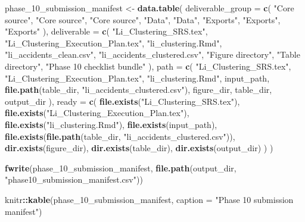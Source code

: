 \documentclass[
]{article}
\newenvironment{Shaded}{\begin{snugshade}}{\end{snugshade}}
\newcommand{\AttributeTok}[1]{\textcolor[rgb]{0.13,0.29,0.53}{#1}}
\newcommand{\FunctionTok}[1]{\textcolor[rgb]{0.13,0.29,0.53}{\textbf{#1}}}
\newcommand{\NormalTok}[1]{#1}
\newcommand{\OtherTok}[1]{\textcolor[rgb]{0.56,0.35,0.01}{#1}}
\newcommand{\SpecialCharTok}[1]{\textcolor[rgb]{0.81,0.36,0.00}{\textbf{#1}}}
\newcommand{\StringTok}[1]{\textcolor[rgb]{0.31,0.60,0.02}{#1}}
\begin{document}
\begin{Shaded}
\begin{Highlighting}[]
\NormalTok{phase\_10\_submission\_manifest }\OtherTok{\textless{}{-}} \FunctionTok{data.table}\NormalTok{(}
  \AttributeTok{deliverable\_group =} \FunctionTok{c}\NormalTok{(}
    \StringTok{"Core source"}\NormalTok{,}
    \StringTok{"Core source"}\NormalTok{,}
    \StringTok{"Core source"}\NormalTok{,}
    \StringTok{"Data"}\NormalTok{,}
    \StringTok{"Data"}\NormalTok{,}
    \StringTok{"Exports"}\NormalTok{,}
    \StringTok{"Exports"}\NormalTok{,}
    \StringTok{"Exports"}
\NormalTok{  ),}
  \AttributeTok{deliverable =} \FunctionTok{c}\NormalTok{(}
    \StringTok{"Li\_Clustering\_SRS.tex"}\NormalTok{,}
    \StringTok{"Li\_Clustering\_Execution\_Plan.tex"}\NormalTok{,}
    \StringTok{"li\_clustering.Rmd"}\NormalTok{,}
    \StringTok{"li\_accidents\_clean.csv"}\NormalTok{,}
    \StringTok{"li\_accidents\_clustered.csv"}\NormalTok{,}
    \StringTok{"Figure directory"}\NormalTok{,}
    \StringTok{"Table directory"}\NormalTok{,}
    \StringTok{"Phase 10 checklist bundle"}
\NormalTok{  ),}
  \AttributeTok{path =} \FunctionTok{c}\NormalTok{(}
    \StringTok{"Li\_Clustering\_SRS.tex"}\NormalTok{,}
    \StringTok{"Li\_Clustering\_Execution\_Plan.tex"}\NormalTok{,}
    \StringTok{"li\_clustering.Rmd"}\NormalTok{,}
\NormalTok{    input\_path,}
    \FunctionTok{file.path}\NormalTok{(table\_dir, }\StringTok{"li\_accidents\_clustered.csv"}\NormalTok{),}
\NormalTok{    figure\_dir,}
\NormalTok{    table\_dir,}
\NormalTok{    output\_dir}
\NormalTok{  ),}
  \AttributeTok{ready =} \FunctionTok{c}\NormalTok{(}
    \FunctionTok{file.exists}\NormalTok{(}\StringTok{"Li\_Clustering\_SRS.tex"}\NormalTok{),}
    \FunctionTok{file.exists}\NormalTok{(}\StringTok{"Li\_Clustering\_Execution\_Plan.tex"}\NormalTok{),}
    \FunctionTok{file.exists}\NormalTok{(}\StringTok{"li\_clustering.Rmd"}\NormalTok{),}
    \FunctionTok{file.exists}\NormalTok{(input\_path),}
    \FunctionTok{file.exists}\NormalTok{(}\FunctionTok{file.path}\NormalTok{(table\_dir, }\StringTok{"li\_accidents\_clustered.csv"}\NormalTok{)),}
    \FunctionTok{dir.exists}\NormalTok{(figure\_dir),}
    \FunctionTok{dir.exists}\NormalTok{(table\_dir),}
    \FunctionTok{dir.exists}\NormalTok{(output\_dir)}
\NormalTok{  )}
\NormalTok{)}

\FunctionTok{fwrite}\NormalTok{(phase\_10\_submission\_manifest, }\FunctionTok{file.path}\NormalTok{(output\_dir, }\StringTok{"phase10\_submission\_manifest.csv"}\NormalTok{))}

\NormalTok{knitr}\SpecialCharTok{::}\FunctionTok{kable}\NormalTok{(phase\_10\_submission\_manifest, }\AttributeTok{caption =} \StringTok{"Phase 10 submission manifest"}\NormalTok{)}
\end{Highlighting}
\end{Shaded}
\end{document}
